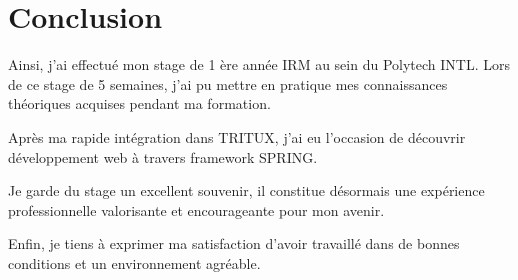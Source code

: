 \documentclass[../rapportdestage.tex]{subfiles}
\begin{document}
\section{Conclusion}

Ainsi, j’ai effectué mon stage de 1 ère année IRM au sein du Polytech INTL. Lors de ce stage de 5 semaines, j’ai pu mettre en pratique mes connaissances théoriques acquises pendant ma formation.

Après ma rapide intégration dans TRITUX, j’ai eu l’occasion de 
découvrir développement web à travers framework SPRING.

Je garde du stage un excellent souvenir, il constitue désormais une expérience professionnelle valorisante et encourageante pour mon avenir.

Enfin, je tiens à exprimer ma satisfaction d’avoir travaillé dans de bonnes conditions  et un environnement agréable.
\end{document}
